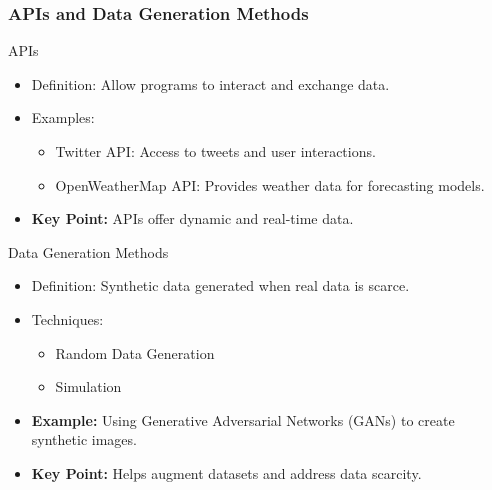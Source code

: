 \documentclass[aspectratio=169]{beamer}
\begin{document}
\begin{frame}[fragile]
    \frametitle{APIs and Data Generation Methods}
    \begin{block}{APIs}
        \begin{itemize}
            \item Definition: Allow programs to interact and exchange data.
            \item Examples:
                \begin{itemize}
                    \item Twitter API: Access to tweets and user interactions.
                    \item OpenWeatherMap API: Provides weather data for forecasting models.
                \end{itemize}
            \item \textbf{Key Point:} APIs offer dynamic and real-time data.
        \end{itemize}
    \end{block}

    \begin{block}{Data Generation Methods}
        \begin{itemize}
            \item Definition: Synthetic data generated when real data is scarce.
            \item Techniques:
                \begin{itemize}
                    \item Random Data Generation
                    \item Simulation
                \end{itemize}
            \item \textbf{Example:} Using Generative Adversarial Networks (GANs) to create synthetic images.
            \item \textbf{Key Point:} Helps augment datasets and address data scarcity.
        \end{itemize}
    \end{block}
\end{frame}
\end{document}
